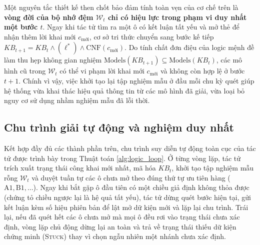 Một nguyên tắc thiết kế then chốt bảo đảm tính toàn vẹn của cơ chế trên là
\textbf{vòng đời của bộ nhớ đệm $\mathcal{W}_t$ chỉ có hiệu lực trong phạm vi duy
nhất một bước $t$}. Ngay khi tác tử tìm ra một ô có kết luận tất yếu và mở thẻ để
nhận thêm lời khai mới $c_{\text{mới}}$, cơ sở tri thức chuyển sang bước kế tiếp
$KB_{t+1} = KB_t \wedge (\ell^*) \wedge \text{CNF}(c_{\text{mới}})$. Do tính chất
đơn điệu của logic mệnh đề làm thu hẹp không gian nghiệm $\mathrm{Models}(KB_{t+1})
\subseteq \mathrm{Models}(KB_t)$, các mô hình cũ trong $\mathcal{W}_t$ có thể vi
phạm lời khai mới $c_{\text{mới}}$ và không còn hợp lệ ở bước $t + 1$. Chính vì
vậy, việc khởi tạo lại tập nghiệm mẫu ở đầu mỗi chu kỳ quét giúp hệ thống vừa
khai thác hiệu quả thông tin từ các mô hình đã giải, vừa loại bỏ nguy cơ sử dụng
nhầm nghiệm mẫu đã lỗi thời.

\subsection{Chu trình giải tự động và nghiệm duy nhất}
\label{subsec:auto_loop_uniqueness}
Kết hợp đầy đủ các thành phần trên, chu trình suy diễn tự động toàn cục của tác tử
được trình bày trong Thuật toán \ref{alg:logic_loop}. Ở từng vòng lặp, tác tử trích
xuất trạng thái công khai mới nhất, mã hóa $KB_t$, khởi tạo tập nghiệm mẫu rỗng
$\mathcal{W}_t$ và duyệt tuần tự các ô chưa mở theo đúng thứ tự ưu tiên hàng
($\text{A1}, \text{B1}, \dots$). Ngay khi bắt gặp ô đầu tiên có một chiều giả định
không thỏa được (chứng tỏ chiều ngược lại là hệ quả tất yếu), tác tử dừng quét
bước hiện tại, gửi kết luận kèm số hiệu phiên bản để lật mở dữ kiện mới và lặp
lại chu trình. Trái lại, nếu đã quét hết các ô chưa mở mà mọi ô đều rơi vào trạng
thái chưa xác định, vòng lặp chủ động dừng lại an toàn và trả về trạng thái thiếu
dữ kiện chứng minh (\textsc{Stuck}) thay vì chọn ngẫu nhiên một nhánh chưa xác
định.

